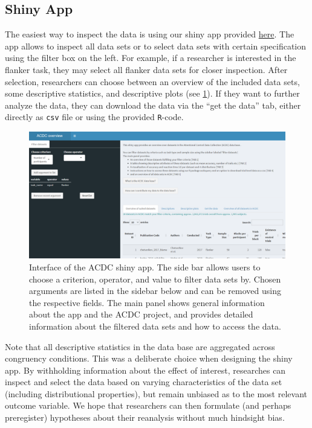 \documentclass[
  man,floatsintext]{apa6}
\begin{document}
\hypertarget{shiny-app}{%
\subsection{Shiny App}\label{shiny-app}}

The easiest way to inspect the data is using our shiny app provided \href{LINKTOSHINYAPP}{here}. The app allows to inspect all data sets or to select data sets with certain specification using the filter box on the left. For example, if a researcher is interested in the flanker task, they may select all flanker data sets for closer inspection. After selection, researchers can choose between an overview of the included data sets, some descriptive statistics, and descriptive plots (see \ref{fig:figure3}). If they want to further analyze the data, they can download the data via the ``get the data'' tab, either directly as \texttt{csv} file or using the provided \texttt{R}-code.



\begin{figure}
\centering
\includegraphics{images/Shiny_interface.png}
\caption{\label{fig:figure3}Interface of the ACDC shiny app. The side bar allows users to choose a criterion, operator, and value to filter data sets by. Chosen arguments are listed in the sidebar below and can be removed using the respective fields. The main panel shows general information about the app and the ACDC project, and provides detailed information about the filtered data sets and how to access the data.}
\end{figure}

Note that all descriptive statistics in the data base are aggregated across congruency conditions. This was a deliberate choice when designing the shiny app. By withholding information about the effect of interest, researches can inspect and select the data based on varying characteristics of the data set (including distributional properties), but remain unbiased as to the most relevant outcome variable. We hope that researchers can then formulate (and perhaps preregister) hypotheses about their reanalysis without much hindsight bias.
\end{document}
